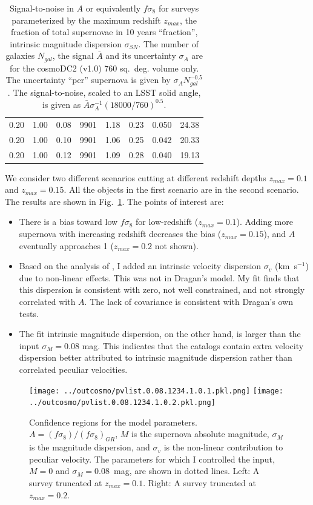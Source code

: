 \documentclass{aastex62}   	%
\begin{document}
\begin{table}
\begin{tabular}{|ccc|ccccc|}
0.20 & 1.00 & 0.08 & 9901 &   1.18 &   0.23 &  0.050 &  24.38 \\
0.20 & 1.00 & 0.10 & 9901 &   1.06 &   0.25 &  0.042 &  20.33 \\
0.20 & 1.00 & 0.12 & 9901 &   1.09 &   0.28 &  0.040 &  19.13 \\
    \hline
   \end{tabular}
   \caption{Signal-to-noise in $A$ or equivalently $f\sigma_8$ for surveys parameterized by the maximum redshift $z_{max}$,
   the fraction of total supernovae in 10 years ``fraction'', intrinsic magnitude dispersion $\sigma_{SN}$.  The number of galaxies
   $N_{gal}$, the signal $\bar{A}$ and its uncertainty $\sigma_A$ are for the cosmoDC2 (v1.0) 760 sq.~deg. volume only.
   The uncertainty ``per'' supernova is given by  $\sigma_A N_{gal}^{-0.5}$.  The signal-to-noise, scaled to an LSST solid angle, is given as 
    $\bar{A} \sigma_A^{-1} (18000/760)^{0.5}$.
   \label{tab:booktabs}}
\end{table}


We consider two different scenarios cutting at different redshift depths $z_{max}=0.1$ and  $z_{max}=0.15$.  All the objects in the first
scenario are in the second scenario.  The results are shown in Fig.~\ref{zmax:fig}.  The points of interest are:
\begin{itemize}
\item There is a bias toward low $f\sigma_8$ for low-redshift ($z_{max}=0.1$).  Adding more supernova with increasing redshift
 decreases the bias  ($z_{max}=0.15$), and $A$ eventually approaches 1 ($z_{max}=0.2$ not shown).
 \item Based on the analysis of \citet{2017MNRAS.471.3135H}, I added an intrinsic velocity dispersion $\sigma_v$ (km~s$^{-1}$) due to non-linear effects.  This was not
 in Dragan's model.  My fit finds that this  dispersion is consistent with zero, not well constrained, and not strongly correlated with
 $A$.  The lack of covariance is consistent with Dragan's own tests.
 \item The fit intrinsic magnitude dispersion, on the other hand, is larger than the input $\sigma_M=0.08$ mag.  This  indicates that the catalogs
 contain 
 extra  velocity dispersion better attributed to intrinsic magnitude dispersion rather than correlated peculiar velocities.
\end{itemize}


\begin{figure}
\texttt{[image: ../outcosmo/pvlist.0.08.1234.1.0.1.pkl.png]}
\texttt{[image: ../outcosmo/pvlist.0.08.1234.1.0.2.pkl.png]}
\caption{Confidence regions for the model parameters.  $A=(f\sigma_8)/(f\sigma_8)_{GR}$, $M$ is the supernova
absolute magnitude, $\sigma_M$ is the magnitude dispersion, and $\sigma_v$ is the non-linear contribution
to peculiar velocity.   The parameters for which I controlled the input, $M=0$ and $\sigma_M=0.08$~mag, are shown in dotted lines.
 Left: A survey truncated at $z_{max}=0.1$.  Right: A survey truncated at $z_{max}=0.2$.
\label{zmax:fig}}
\end{figure}
\end{document}
